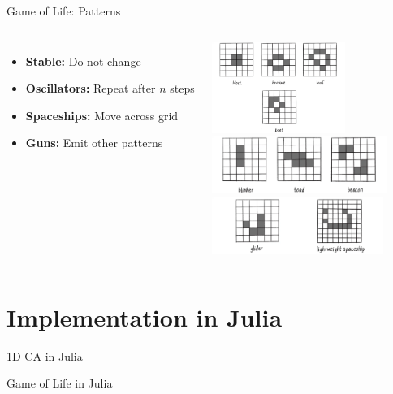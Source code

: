 \begin{frame}{Game of Life: Patterns}
    \begin{columns}
        \begin{itemize}
            \item \textbf{Stable:} Do not change
            \item \textbf{Oscillators:} Repeat after $n$ steps
            \item \textbf{Spaceships:} Move across grid
            \item \textbf{Guns:} Emit other patterns
        \end{itemize}
        \centering
        \includegraphics[height=8em]{../paper/figures/stable}\\
        \includegraphics[height=5em]{../paper/figures/oscillator}\\
        \includegraphics[height=5em]{../paper/figures/spaceship}

    \end{columns}
\end{frame}


\section{Implementation in Julia}
\begin{frame}{1D CA in Julia}

\end{frame}

\begin{frame}{Game of Life in Julia}

\end{frame}


